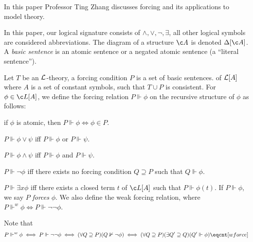 In this paper Professor Ting Zhang discusses forcing and its applications to model theory.

In this paper, our logical signature consists of $\land,\lor,\neg,\exists$, all other logical symbols are considered abbreviations.
The diagram of a structure $\c A$ is denoted $\Delta[\c A]$.
A {\it basic sentence} is an atomic sentence or a negated atomic sentence (a ``literal sentence'').

\bdefn[title=Forcing Condition]

    Let $T$ be an ${\cal L}$-theory, a {\emphcolor forcing condition} $P$ is a set of basic sentences. of ${\cal L}[A]$ where $A$ is a set of constant symbols, such that $T\cup P$ is consistent.
    For $\phi\in\c L[A]$, we define the {\emphcolor forcing relation} $P\Vdash\phi$ on the recursive structure of $\phi$ as follows:
    \benum
        \item if $\phi$ is atomic, then $P\Vdash\phi\iff\phi\in P$.
        \item $P\Vdash\phi\lor\psi$ iff $P\Vdash\phi$ or $P\Vdash\psi$.
        \item $P\Vdash\phi\land\psi$ iff $P\Vdash\phi$ and $P\Vdash\psi$.
        \item $P\Vdash\neg\phi$ iff there exists no forcing condition $Q\supseteq P$ such that $Q\Vdash\phi$.
        \item $P\Vdash\exists x\phi$ iff there exists a closed term $t$ of $\c L[A]$ such that $P\Vdash\phi(t)$.
    \eenum
    If $P\Vdash\phi$, we say $P$ {\it forces} $\phi$.
    We also define the {\emphcolor weak forcing relation}, where $P\Vdash^w\phi\iff P\Vdash\neg\neg\phi$.

\edefn

Note that
$$ P\Vdash^w\phi \iff P\Vdash\neg\neg\phi \iff (\forall Q\supseteq P)(Q\nVdash\neg\phi) \iff (\forall Q\supseteq P)(\exists Q'\supseteq Q)(Q'\Vdash\phi) \eqcnt[wforce] $$

